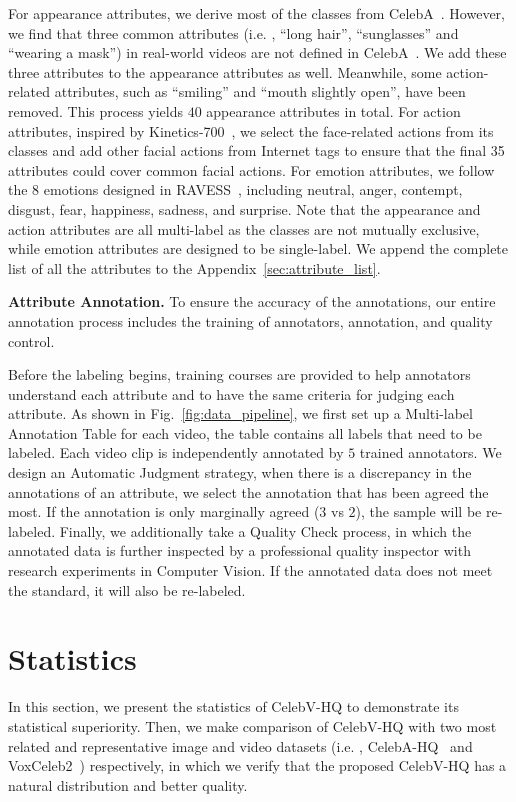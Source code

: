 For appearance attributes, we derive most of the classes from CelebA~\cite{celeba15}. However, we find that three common attributes (i.e. , ``long hair'', ``sunglasses'' and ``wearing a mask'') in real-world videos are not defined in CelebA~\cite{celeba15}. We add these three attributes to the appearance attributes as well. Meanwhile, some action-related attributes, such as ``smiling'' and ``mouth slightly open'', have been removed. This process yields $40$ appearance attributes in total. For action attributes, inspired by Kinetics-700~\cite{kinetics700}, we select the face-related actions from its classes and add other facial actions from Internet tags to ensure that the final 35 attributes could cover common facial actions. For emotion attributes, we follow the $8$ emotions designed in RAVESS~\cite{RAVDESS}, including neutral, anger, contempt, disgust, fear, happiness, sadness, and surprise. Note that the appearance and action attributes are all multi-label as the classes are not mutually exclusive, while emotion attributes are designed to be single-label. We append the complete list of all the attributes to the Appendix~\ref{sec:attribute_list}.

\textbf{Attribute Annotation.} To ensure the accuracy of the annotations, our entire annotation process includes the training of annotators, annotation, and quality control. 

Before the labeling begins, training courses are provided to help annotators understand each attribute and to have the same criteria for judging each attribute. As shown in Fig.~\ref{fig:data_pipeline}, we first set up a Multi-label Annotation Table for each video, the table contains all labels that need to be labeled. Each video clip is independently annotated by $5$ trained annotators. We design an Automatic Judgment strategy, when there is a discrepancy in the annotations of an attribute, we select the annotation that has been agreed the most. If the annotation is only marginally agreed ($3$ vs $2$), the sample will be re-labeled. Finally, we additionally take a Quality Check process, in which the annotated data is further inspected by a professional quality inspector with research experiments in Computer Vision. If the annotated data does not meet the standard, it will also be re-labeled.

\section{Statistics}

In this section, we present the statistics of CelebV-HQ to demonstrate its statistical superiority. Then, we make comparison of CelebV-HQ with two most related and representative image and video datasets (i.e. , CelebA-HQ~\cite{celebahq} and VoxCeleb2~\cite{vox2}) respectively, in which we verify that the proposed CelebV-HQ has a natural distribution and better quality.


